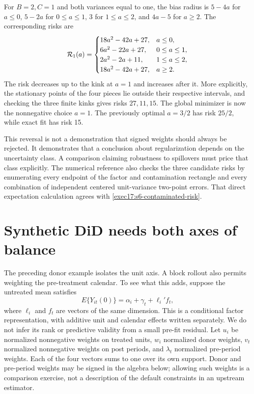For $B=2,C=1$ and both variances equal to one, the bias radius is
$5-4a$ for $a\leq0$, $5-2a$ for $0\leq a\leq1$, 3 for
$1\leq a\leq2$, and $4a-5$ for $a\geq2$. The corresponding risks are
\begin{equation}
 {\cal R}_1(a)=
 \begin{cases}
 18a^2-42a+27,&a\leq0,\\
 6a^2-22a+27,&0\leq a\leq1,\\
 2a^2-2a+11,&1\leq a\leq2,\\
 18a^2-42a+27,&a\geq2.
 \end{cases}
 \label{exec17:s6-contaminated-pieces}
\end{equation}
The risk decreases up to the kink at $a=1$ and increases after it.
More explicitly, the stationary points of the four pieces lie outside
their respective intervals, and checking the three finite kinks gives
risks $27,11,15$. The global minimizer is now the nonnegative choice
$a=1$. The previously optimal $a=3/2$ has risk $25/2$, while
exact fit has risk 15.

This reversal is not a demonstration that signed weights should always be
rejected. It demonstrates that a conclusion about regularization depends
on the uncertainty class. A comparison claiming robustness to spillovers
must price that class explicitly. The numerical reference also checks the
three candidate risks by enumerating every endpoint of the factor and
contamination rectangle and every combination of independent centered
unit-variance two-point errors. That direct expectation calculation agrees
with \eqref{exec17:s6-contaminated-risk}.~\citep{exec17_s6_math}

\section{Synthetic DiD needs both axes of balance}
\label{exec17:s6-sdid}

The preceding donor example isolates the unit axis. A block rollout also
permits weighting the pre-treatment calendar. To see what this adds, suppose
the untreated mean satisfies
\begin{equation}
 E\{Y_{it}(0)\}=\alpha_i+\gamma_t+\ell_i'f_t,
 \label{exec17:s6-factor-law}
\end{equation}
where $\ell_i$ and $f_t$ are vectors of the same dimension. This is a
conditional factor representation, with additive unit and calendar effects
written separately. We do not infer its rank or predictive validity from a
small pre-fit residual. Let $u_i$ be normalized nonnegative weights on
treated units, $w_i$ normalized donor weights, $v_t$ normalized
nonnegative weights on post periods, and $\lambda_t$ normalized
pre-period weights. Each of the four vectors sums to one over its own
support. Donor and pre-period weights may be signed in the algebra below;
allowing such weights is a comparison exercise, not a description of the
default constraints in an upstream estimator.


